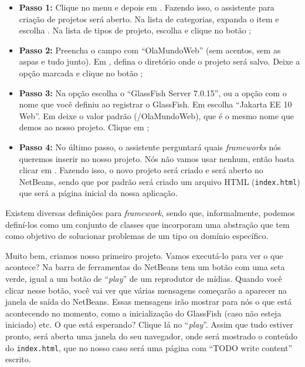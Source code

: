 \begin{itemize}

    \item \textbf{Passo 1:} Clique no menu  e depois em  . Fazendo isso, o assistente para criação de projetos será aberto. Na lista de categorias, expanda o item   e escolha  . Na lista de tipos de projeto, escolha   e clique no botão  ;
    
    \item \textbf{Passo 2:} Preencha o campo  com ``OlaMundoWeb'' (sem acentos, sem as aspas e tudo junto). Em , defina o diretório onde o projeto será salvo. Deixe a opção  marcada e clique no botão ;
    
    \item \textbf{Passo 3:} Na opção  escolha o ``GlassFish Server 7.0.15'', ou a opção com o nome que você definiu ao registrar o GlassFish. Em  escolha ``Jakarta EE 10 Web''. Em  deixe o valor padrão (/OlaMundoWeb), que é o mesmo nome que demos ao nosso projeto. Clique em ;
    
    \item \textbf{Passo 4:} No último passo, o assistente perguntará quais \textit{frameworks} nós queremos inserir no nosso projeto. Nós não vamos usar nenhum, então basta clicar em . Fazendo isso, o novo projeto será criado e será aberto no NetBeans, sendo que por padrão será criado um arquivo HTML (\texttt{index.html}) que será a página inicial da nossa aplicação.
    
\end{itemize}

\begin{saibaMais}
    Existem diversas definições para \textit{framework}, sendo que, informalmente, podemos definí-los como um conjunto de classes que incorporam uma abstração que tem como objetivo de solucionar problemas de um tipo ou domínio específico.
\end{saibaMais}

Muito bem, criamos nosso primeiro projeto. Vamos executá-lo para ver o que acontece? Na barra de ferramentas do NetBeans tem um botão com uma seta verde, igual a um botão de ``\textit{play}'' de um reprodutor de mídias. Quando você clicar nesse botão, você vai ver que várias mensagens começarão a aparecer na janela de saída do NetBeans. Essas mensagens irão mostrar para nós o que está acontecendo no momento, como a inicialização do GlassFish (caso não esteja iniciado) etc. O que está esperando? Clique lá no ``\textit{play}''. Assim que tudo estiver pronto, será aberta uma janela do seu navegador, onde será mostrado o conteúdo do \texttt{index.html}, que no nosso caso será uma página com ``TODO write content'' escrito.

